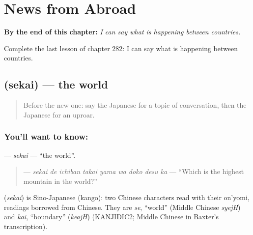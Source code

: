 
\chapter{News from Abroad}
\label{ch:ja-news-from-abroad}

\begin{chapteropening}
\textbf{By the end of this chapter:} \emph{I can say what is happening between countries.}

Complete the last lesson of chapter 282: I can say what is happening between countries.
\end{chapteropening}

\section[\texorpdfstring{\ja{せかい} (sekai)}{せかい (sekai)}]{ (sekai) — the world}

\label{lesson:JA-C282-sekai}



\begin{quote}
Before the new one: say the Japanese for a topic of conversation, then the Japanese for an uproar.
\end{quote}

\subsection*{You'll want to know: }
\textbf{} — \emph{sekai} — \textquotedblleft{}the world\textquotedblright{}.

\begin{quote}
\textbf{    } — \emph{sekai de ichiban takai yama wa doko desu ka} — \textquotedblleft{}Which is the highest mountain in the world?\textquotedblright{}
\end{quote}

\begin{cousinweb}
\textbf{} (\emph{sekai}) is Sino-Japanese (kango): two Chinese characters read with their on'yomi, readings borrowed from Chinese. They are \emph{se}, \textquotedblleft{}world\textquotedblright{} (Middle Chinese \emph{syejH}) and \emph{kai}, \textquotedblleft{}boundary\textquotedblright{} (\emph{keajH}) (KANJIDIC2; Middle Chinese in Baxter's transcription).
\end{cousinweb}

